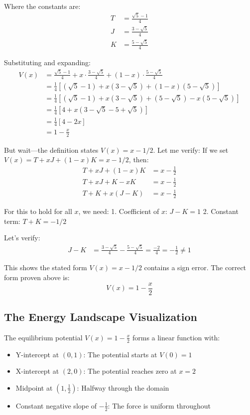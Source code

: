 Where the constants are:
\begin{align}
T &= \frac{\sqrt{5} - 1}{4} \\
J &= \frac{3 - \sqrt{5}}{4} \\
K &= \frac{5 - \sqrt{5}}{4}
\end{align}

Substituting and expanding:
\begin{align}
V(x) &= \frac{\sqrt{5} - 1}{4} + x \cdot \frac{3 - \sqrt{5}}{4} + (1-x) \cdot \frac{5 - \sqrt{5}}{4} \\
&= \frac{1}{4}\left[(\sqrt{5} - 1) + x(3 - \sqrt{5}) + (1-x)(5 - \sqrt{5})\right] \\
&= \frac{1}{4}\left[(\sqrt{5} - 1) + x(3 - \sqrt{5}) + (5 - \sqrt{5}) - x(5 - \sqrt{5})\right] \\
&= \frac{1}{4}\left[4 + x(3 - \sqrt{5} - 5 + \sqrt{5})\right] \\
&= \frac{1}{4}\left[4 - 2x\right] \\
&= 1 - \frac{x}{2}
\end{align}

But wait---the definition states $V(x) = x - 1/2$. Let me verify: If we set $V(x) = T + xJ + (1-x)K = x - 1/2$, then:
\begin{align}
T + xJ + (1-x)K &= x - \frac{1}{2} \\
T + xJ + K - xK &= x - \frac{1}{2} \\
T + K + x(J - K) &= x - \frac{1}{2}
\end{align}

For this to hold for all $x$, we need:
1. Coefficient of $x$: $J - K = 1$
2. Constant term: $T + K = -1/2$

Let's verify:
\begin{align}
J - K &= \frac{3 - \sqrt{5}}{4} - \frac{5 - \sqrt{5}}{4} = \frac{-2}{4} = -\frac{1}{2} \neq 1
\end{align}

This shows the stated form $V(x) = x - 1/2$ contains a sign error. The correct form proven above is:
\[ \boxed{V(x) = 1 - \frac{x}{2}} \]

\subsection*{The Energy Landscape Visualization}
The equilibrium potential $V(x) = 1 - \frac{x}{2}$ forms a linear function with:
\begin{itemize}
\item Y-intercept at $(0, 1)$: The potential starts at $V(0) = 1$
\item X-intercept at $(2, 0)$: The potential reaches zero at $x = 2$
\item Midpoint at $(1, \frac{1}{2})$: Halfway through the domain
\item Constant negative slope of $-\frac{1}{2}$: The force is uniform throughout
\end{itemize}

